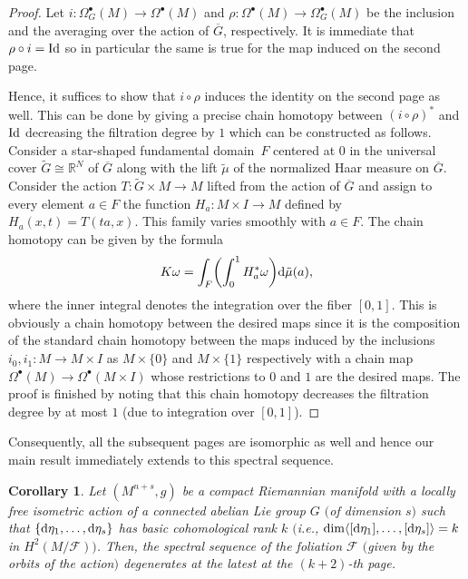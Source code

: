 \documentclass[pdftex]{sigma}
\numberwithin{equation}{section}
\newtheorem{cor}[tw]{Corollary}
\theoremstyle{definition}
\begin{document}
\begin{proof} Let $i\colon \Omega^{\bullet}_G(M)\to\Omega^{\bullet}(M)$ and $\rho\colon \Omega^{\bullet}(M)\to\Omega^{\bullet}_G(M)$ be the inclusion and the averaging over the action of $\overline{G}$, respectively. It is immediate that $\rho\circ i={\rm Id}$ so in particular the same is true for the map induced on the second page.

Hence, it suffices to show that $i\circ\rho$ induces the identity on the second page as well. This can be done by giving a precise chain homotopy between $(i\circ\rho)^*$ and ${\rm Id}$ decreasing the filtration degree by $1$ which can be constructed as follows. Consider a star-shaped fundamental domain~$F$ centered at $0$ in the universal cover $\tilde{G}\cong\mathbb{R}^{N}$ of $\overline{G}$ along with the lift $\tilde{\mu}$ of the normalized Haar measure on $\overline{G}$. Consider the action $T\colon \tilde{G}\times M\to M$ lifted from the action of $\overline{G}$ and assign to every element $a\in F$ the function $H_a\colon M\times I\to M$ defined by $H_a(x,t)=T(ta,x)$. This family varies smoothly with $a\in F$. The chain homotopy can be given by the formula
\[K\omega=\int_F\biggl(\int_0^1H^*_a\omega\biggr){\rm d}\tilde{\mu}(a),\]
where the inner integral denotes the integration over the fiber $[0,1]$. This is obviously a chain homotopy between the desired maps since it is the composition of the standard chain homotopy between the maps induced by the inclusions $i_0,i_1\colon M\to M\times I$ as $M\times\{0\}$ and $M\times\{1\}$ respectively with a chain map $\Omega^{\bullet}(M)\to\Omega^{\bullet}(M\times I)$ whose restrictions to $0$ and $1$ are the desired maps. The proof is finished by noting that this chain homotopy decreases the filtration degree by at most $1$ (due to integration over $[0,1]$).
\end{proof}

Consequently, all the subsequent pages are isomorphic as well and hence our main result immediately extends to this spectral sequence.

\begin{cor}Let $(M^{n+s},g)$ be a compact Riemannian manifold with a locally free isometric action of a connected abelian Lie group $G$ $($of dimension $s)$ such that $\{{\rm d}\eta_1,\dots,{\rm d}\eta_s\}$ has basic cohomological rank $k$ $($i.e., $\dim \langle [{\rm d}\eta_1], \dots, [{\rm d}\eta_s] \rangle = k$ in $H^2(M\slash\mathcal{F}))$. Then, the spectral sequence of the foliation $\mathcal{F}$ $($given by the orbits of the action$)$ degenerates at the latest at the ${(k+2)}$-th page.
\end{cor}
\end{document}
